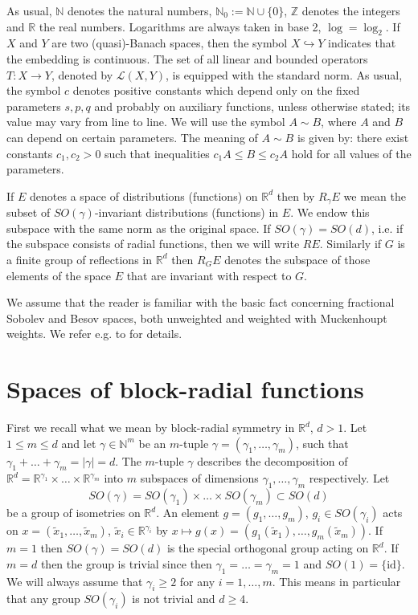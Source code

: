 \documentclass[12pt]{article}
\newcommand{\R}{{\mathbb R}}
\newcommand{\N}{{\mathbb N}}
\newcommand{\Z}{\mathbb Z}
\newcommand{\cl}{{\mathcal{L}}}
\begin{document}
As usual, $\N$ denotes the natural numbers, $\N_0:= \N \cup \{0\}$,  $\Z$ denotes the integers and
$\R$ the real numbers. Logarithms are always taken in base 2, $\log=\log_2$.
If $X$ and $Y$ are two (quasi)-Banach spaces, then the symbol  $X \hookrightarrow Y$ indicates that the embedding is continuous.
The set of all linear  and bounded operators
$T : X \to Y$, denoted by $\cl (X,Y)$, is  equipped with the standard norm.
As usual, the symbol  $c $ denotes positive constants
which depend only on the fixed parameters $s,p,q$ and probably on auxiliary functions,
unless otherwise stated; its value  may vary from line to line.
We will use the symbol $A \sim B$, where $A$ and $B$ can depend on certain parameters. The meaning of $A \sim B$ is given by: there exist  constants $c_1,c_2>0$ such that  inequalities $ c_1 A \le B \le c_2 A$ hold for all values of the parameters. 


	If $E$ denotes a space of distributions  (functions) on $\R^d$ then by $R_\gamma E$ we mean the subset of $SO(\gamma)$-invariant  distributions (functions) in $E$. We endow this subspace  with the same norm as the original space. If $SO(\gamma)=SO(d)$, i.e. if  the subspace consists of radial functions, then we will write $RE$.  
	Similarly if $G$ is a finite group of reflections in $\R^d$ then $R_G E$  denotes  the subspace of those elements of the space $E$ that are invariant with respect to $G$. 
	 
    We assume that the reader is familiar with the basic fact concerning fractional Sobolev and Besov spaces, both unweighted and weighted with Muckenhoupt weights. We refer e.g. to  \cite{Tr1, Bui, HS} for details.  

\section{Spaces of block-radial functions}
First we recall what we mean by block-radial symmetry in $\R^d$, $d>1$. 
Let $ 1\le m\le d$ and let $\gamma\in\N^{m}$ be  an $m$-tuple  $\gamma=(\gamma_1,\ldots, \gamma_m)$, such that  $\gamma_1+\ldots + \gamma_m = |\gamma|= d$. The $m$-tuple  $\gamma$ describes the decomposition of $\R^{d}= \R^{\gamma_{1}}\times\dots\times\R^{\gamma_{m}}$  into $m$ subspaces of dimensions $\gamma_{1},\dots,\gamma_{m}$ respectively.  Let 
\[
SO(\gamma)= SO(\gamma_1)\times \ldots \times SO(\gamma_m)\subset SO(d)
\] 
be a group of isometries on $\R^{d}$. An element $g=(g_1,\ldots, g_m)$, $g_i\in SO(\gamma_i)$  acts  on $x=(\tilde{x}_1,\ldots, \tilde{x}_m)$, $\tilde{x}_i\in \R^{\gamma_i}$ by $x\mapsto g(x)= (g_1(\tilde{x}_1),\ldots, g_m(\tilde{x}_m))$.  If $m=1$ then $SO(\gamma)= SO(d)$ is the special orthogonal group acting on $\R^d$. If $m=d$ then the group  is trivial since then $\gamma_1= \ldots =\gamma_m = 1$ and $SO(1)= \{\mathrm{id}\}$.  We will always assume that $\gamma_i\ge 2$ for any $i=1,\ldots, m$. This means in particular that any group $SO(\gamma_i)$ is not trivial and  $d\ge 4$. 
\end{document}
